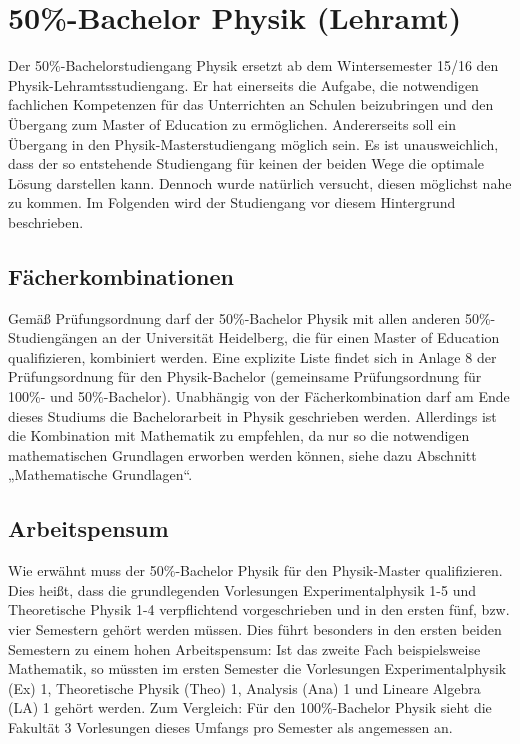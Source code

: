\section{50\%-Bachelor Physik (Lehramt)} %

Der 50\%-Bachelorstudiengang Physik ersetzt ab dem Wintersemester 15/16 den Physik-Lehramtsstudiengang. Er hat einerseits die Aufgabe, die notwendigen fachlichen Kompetenzen für das Unterrichten an Schulen beizubringen und den Übergang zum Master of Education zu ermöglichen. Andererseits soll ein Übergang in den Physik-Masterstudiengang möglich sein. Es ist unausweichlich, dass der so entstehende Studiengang für keinen der beiden Wege die optimale Lösung darstellen kann. Dennoch wurde natürlich versucht, diesen möglichst nahe zu kommen. Im Folgenden wird der Studiengang vor diesem Hintergrund beschrieben.


\subsection{Fächerkombinationen}

Gemäß Prüfungsordnung darf der 50\%-Bachelor Physik mit allen anderen 50\%-Studiengängen an der Universität Heidelberg, die für einen Master of Education qualifizieren, kombiniert werden. Eine explizite Liste findet sich in Anlage 8 der Prüfungsordnung für den Physik-Bachelor (gemeinsame Prüfungsordnung für 100\%- und 50\%-Bachelor). Unabhängig von der Fächerkombination darf am Ende dieses Studiums die Bachelorarbeit in Physik geschrieben werden. Allerdings ist die Kombination mit Mathematik zu empfehlen, da nur so die notwendigen mathematischen Grundlagen erworben werden können, siehe dazu Abschnitt „Mathematische Grundlagen“.


\subsection{Arbeitspensum}

Wie erwähnt muss der 50\%-Bachelor Physik für den Physik-Master qualifizieren. Dies heißt, dass die grundlegenden Vorlesungen Experimentalphysik 1-5 und Theoretische Physik 1-4 verpflichtend vorgeschrieben und in den ersten fünf, bzw. vier Semestern gehört werden müssen. Dies führt besonders in den ersten beiden Semestern zu einem hohen Arbeitspensum: Ist das zweite Fach beispielsweise Mathematik, so müssten im ersten Semester die Vorlesungen Experimentalphysik (Ex) 1, Theoretische Physik (Theo) 1, Analysis (Ana) 1 und Lineare Algebra (LA) 1 gehört werden. Zum Vergleich: Für den 100\%-Bachelor Physik sieht die Fakultät 3 Vorlesungen dieses Umfangs pro Semester als angemessen an. 

